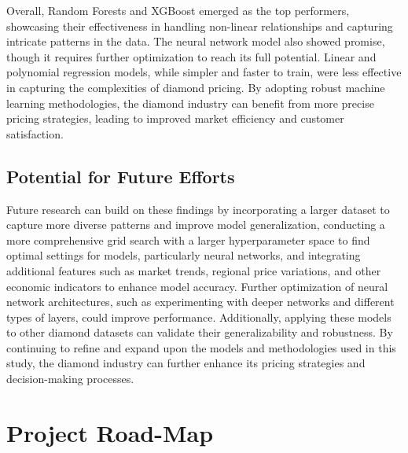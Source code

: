 \documentclass[conference]{IEEEtran}
\begin{document}
Overall, Random Forests and XGBoost emerged as the top performers, showcasing their effectiveness in handling non-linear relationships and capturing intricate patterns in the data. The neural network model also showed promise, though it requires further optimization to reach its full potential. Linear and polynomial regression models, while simpler and faster to train, were less effective in capturing the complexities of diamond pricing. By adopting robust machine learning methodologies, the diamond industry can benefit from more precise pricing strategies, leading to improved market efficiency and customer satisfaction.

\subsection{Potential for Future Efforts}

Future research can build on these findings by incorporating a larger dataset to capture more diverse patterns and improve model generalization, conducting a more comprehensive grid search with a larger hyperparameter space to find optimal settings for models, particularly neural networks, and integrating additional features such as market trends, regional price variations, and other economic indicators to enhance model accuracy. Further optimization of neural network architectures, such as experimenting with deeper networks and different types of layers, could improve performance. Additionally, applying these models to other diamond datasets can validate their generalizability and robustness. By continuing to refine and expand upon the models and methodologies used in this study, the diamond industry can further enhance its pricing strategies and decision-making processes.

\section{Project Road-Map}
\end{document}
